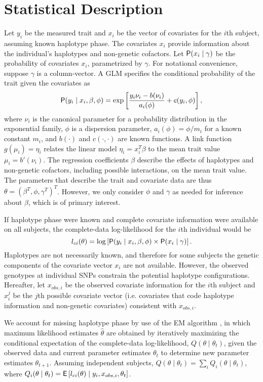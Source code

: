 \documentclass[article, shortnames]{jss}
\begin{document}
\section{Statistical Description}

Let $y_i$ be the measured trait and $x_i$ be the vector of covariates for
the $i$th subject, assuming known haplotype phase. The covariates $x_i$
provide information about the individual's haplotypes and non-genetic
cofactors. Let $\mathsf{P}(x_i \mid \gamma)$ be the probability of covariates
$x_i$, parametrized by $\gamma$.  For notational convenience, suppose $\gamma$ is
a column-vector. A GLM specifies the conditional probability of the
trait given the covariates as $$\mathsf{P}(y_i \mid x_i, \beta, \phi) = \exp \left
[ \frac{y_i \nu_i - b(\nu_i)}{a_i(\phi)} + c(y_i, \phi) \right ],$$ where
$\nu_i$ is the canonical parameter for a probability distribution in the
exponential family, $\phi$ is a dispersion parameter, $a_i(\phi)=\phi/m_i$
for a known constant $m_i$, and $b(\cdot)$ and $c(\cdot,\cdot)$ are known
functions. A link function $g(\mu_i)=\eta_i$ relates the linear model
$\eta_i = x_i^T \beta$ to the mean trait value $\mu_i=b'(\nu_i)$. The
regression coefficients $\beta$ describe the effects of haplotypes and
non-genetic cofactors, including possible interactions, on the mean trait
value. The parameters that describe the trait and covariate data are thus
$\theta = (\beta^T, \phi, \gamma^T)^T$. However, we only consider $\phi$ and
$\gamma$ as needed for inference about $\beta$, which is of primary
interest.

If haplotype phase were known and complete covariate information were
available on all subjects, the complete-data log-likelihood for the $i$th
individual would be $$l_{ci}(\theta)=\log \left [ \mathsf{P} (y_i \mid x_i, \beta,
\phi) \times \mathsf{P}(x_i \mid \gamma) \right ].$$ Haplotypes are not necessarily
known, and therefore for some subjects the genetic components of the
covariate vector $x_i$ are not available. However, the observed 
genotypes at individual SNPs constrain the potential haplotype configurations. 
Hereafter, let $x_{obs,i}$ be the observed covariate information for
the $i$th subject and $x_i^j$ be the $j$th possible covariate vector 
(i.e. covariates that code haplotype information 
and non-genetic covariates) consistent with $x_{obs,i}$.

We account for missing haplotype phase by use of the EM algorithm
\citep{Dempster77}, in which maximum likelihood estimates $\widehat
\theta$ are obtained by iteratively maximizing the conditional expectation
of the complete-data log-likelihood, $Q(\theta \mid \theta_t)$, given the
observed data and current parameter estimates $\theta_t$ to determine new
parameter estimates $\theta_{t+1}$. Assuming independent subjects,
$Q(\theta \mid \theta_t) = \sum_i Q_i (\theta \mid \theta_t)$, 
where $Q_i (\theta \mid \theta_t) = 
{\mathsf{E}} \left [ l_{ci}(\theta) \mid 
y_i, x_{obs,i}, \theta_t \right ]$.
\end{document}
